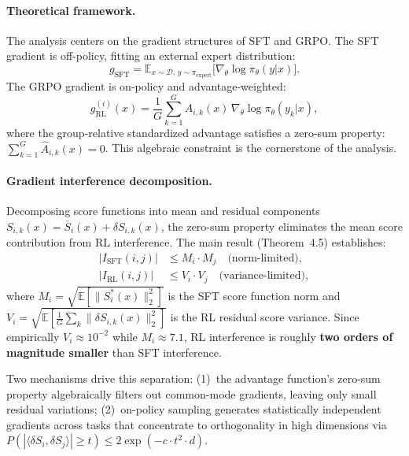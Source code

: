 \documentclass[11pt,a4paper]{article}
\begin{document}
\paragraph{Theoretical framework.} The analysis centers on the gradient structures of SFT and GRPO. The SFT gradient is off-policy, fitting an external expert distribution:
\begin{equation}
g_{\text{SFT}} = \mathbb{E}_{x \sim \mathcal{D},\, y \sim \pi_{\text{expert}}} \bigl[\nabla_\theta \log \pi_\theta(y|x)\bigr].
\end{equation}
The GRPO gradient is on-policy and advantage-weighted:
\begin{equation}
g_{\text{RL}}^{(i)}(x) = \frac{1}{G}\sum_{k=1}^{G} \hat{A}_{i,k}(x)\, \nabla_\theta \log \pi_\theta(y_k|x),
\end{equation}
where the group-relative standardized advantage satisfies a zero-sum property: $\sum_{k=1}^{G} \hat{A}_{i,k}(x) = 0$. This algebraic constraint is the cornerstone of the analysis.

\paragraph{Gradient interference decomposition.} Decomposing score functions into mean and residual components $S_{i,k}(x) = \bar{S}_i(x) + \delta S_{i,k}(x)$, the zero-sum property eliminates the mean score contribution from RL interference. The main result (Theorem~4.5) establishes:
\begin{align}
|I_{\text{SFT}}(i,j)| &\leq M_i \cdot M_j \quad \text{(norm-limited)}, \\
|I_{\text{RL}}(i,j)| &\leq V_i \cdot V_j \quad \text{(variance-limited)},
\end{align}
where $M_i = \sqrt{\mathbb{E}[\|S_i^*(x)\|_2^2]}$ is the SFT score function norm and $V_i = \sqrt{\mathbb{E}[\frac{1}{G}\sum_k \|\delta S_{i,k}(x)\|_2^2]}$ is the RL residual score variance. Since empirically $V_i \approx 10^{-2}$ while $M_i \approx 7.1$, RL interference is roughly \textbf{two orders of magnitude smaller} than SFT interference.

Two mechanisms drive this separation: (1)~the advantage function's zero-sum property algebraically filters out common-mode gradients, leaving only small residual variations; (2)~on-policy sampling generates statistically independent gradients across tasks that concentrate to orthogonality in high dimensions via $P(|\langle \delta S_i, \delta S_j \rangle| \geq t) \leq 2\exp(-c \cdot t^2 \cdot d)$.
\end{document}
